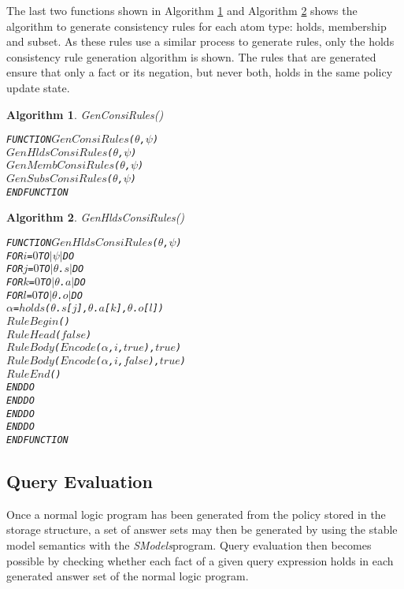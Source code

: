\documentclass[11pt]{report}
\newenvironment{vverbatim}
{
  \begin{alltt}
}
{
    \vspace{-\baselineskip}
  \end{alltt}
}
\newtheorem{vvalgorithm}{Algorithm}[chapter]
\newenvironment{valgorithm}[2]
{
  \begin{vvalgorithm}{#1}
    \label{#2}
    \small
    \begin{vverbatim}
}
{
    \end{vverbatim}
  \end{vvalgorithm}
}
\begin{document}
          The last two functions shown in Algorithm \ref{algo-polup-gconr}
          and Algorithm \ref{algo-polup-ghcor} shows the algorithm to generate
          consistency rules for each atom type: holds, membership and subset.
          As these rules use a similar process to generate rules, only the
          holds consistency rule generation algorithm is shown. The rules that
          are generated ensure that only a fact or its negation, but never
          both, holds in the same policy update state.

          \begin{valgorithm}{GenConsiRules()}{algo-polup-gconr}
FUNCTION \(GenConsiRules\)(\(\theta\), \(\psi\))
  \(GenHldsConsiRules\)(\(\theta\), \(\psi\))
  \(GenMembConsiRules\)(\(\theta\), \(\psi\))
  \(GenSubsConsiRules\)(\(\theta\), \(\psi\))
ENDFUNCTION
          \end{valgorithm}

          \begin{valgorithm}{GenHldsConsiRules()}{algo-polup-ghcor}
FUNCTION \(GenHldsConsiRules\)(\(\theta\), \(\psi\))
  FOR \(i\) = \(0\) TO \(|\psi|\) DO
    FOR \(j\) = \(0\) TO \(|\)\(\theta\).\(s\)\(|\) DO
      FOR \(k\) = \(0\) TO \(|\)\(\theta\).\(a\)\(|\) DO
        FOR \(l\) = \(0\) TO \(|\)\(\theta\).\(o\)\(|\) DO
          \(\alpha\) = \(holds\)(\(\theta\).\(s\)[\(j\)], \(\theta\).\(a\)[\(k\)], \(\theta\).\(o\)[\(l\)])
          \(RuleBegin\)()
          \(RuleHead\)(\(false\))
          \(RuleBody\)(\(Encode\)(\(\alpha\), \(i\), \(true\)), \(true\))
          \(RuleBody\)(\(Encode\)(\(\alpha\), \(i\), \(false\)), \(true\))
          \(RuleEnd\)()
        ENDDO
      ENDDO
    ENDDO
  ENDDO
ENDFUNCTION
          \end{valgorithm}

      \subsection{Query Evaluation}
        \label{subs-polup-evalu}

        Once a normal logic program has been generated from the policy stored
        in the storage structure, a set of answer sets may then be generated
        by using the stable model semantics \cite{SIM} with the
        {\em SModels}\footnotemark program. Query evaluation then becomes
        possible by checking whether each fact of a given query expression
        holds in each generated answer set of the normal logic program.

\end{document}
